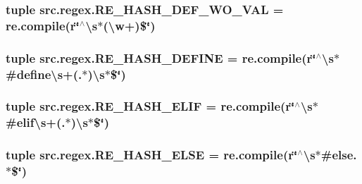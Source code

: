 \hypertarget{namespacesrc_1_1regex_a2c971b22dfac3f240df57813857aeefd}{
\subsubsection[{R\-E\-\_\-\-H\-A\-S\-H\-\_\-\-D\-E\-F\-\_\-\-W\-O\-\_\-\-V\-A\-L}]{\setlength{\rightskip}{0pt plus 5cm}tuple src.\-regex.\-R\-E\-\_\-\-H\-A\-S\-H\-\_\-\-D\-E\-F\-\_\-\-W\-O\-\_\-\-V\-A\-L = re.\-compile(r\char`\"{}$^\wedge$\textbackslash{}s$\ast$(\textbackslash{}w+)\$\char`\"{})}}\label{namespacesrc_1_1regex_a2c971b22dfac3f240df57813857aeefd}
\hypertarget{namespacesrc_1_1regex_a8250e9b27e13553413c3fd8680d99348}{
\subsubsection[{R\-E\-\_\-\-H\-A\-S\-H\-\_\-\-D\-E\-F\-I\-N\-E}]{\setlength{\rightskip}{0pt plus 5cm}tuple src.\-regex.\-R\-E\-\_\-\-H\-A\-S\-H\-\_\-\-D\-E\-F\-I\-N\-E = re.\-compile(r\char`\"{}$^\wedge$\textbackslash{}s$\ast$\#define\textbackslash{}s+(.$\ast$)\textbackslash{}s$\ast$\$\char`\"{})}}\label{namespacesrc_1_1regex_a8250e9b27e13553413c3fd8680d99348}
\hypertarget{namespacesrc_1_1regex_a4041372fdcfc96f1c54040360235f008}{
\subsubsection[{R\-E\-\_\-\-H\-A\-S\-H\-\_\-\-E\-L\-I\-F}]{\setlength{\rightskip}{0pt plus 5cm}tuple src.\-regex.\-R\-E\-\_\-\-H\-A\-S\-H\-\_\-\-E\-L\-I\-F = re.\-compile(r\char`\"{}$^\wedge$\textbackslash{}s$\ast$\#elif\textbackslash{}s+(.$\ast$)\textbackslash{}s$\ast$\$\char`\"{})}}\label{namespacesrc_1_1regex_a4041372fdcfc96f1c54040360235f008}
\hypertarget{namespacesrc_1_1regex_ada84074dfe7c76282dd9c276b132256e}{
\subsubsection[{R\-E\-\_\-\-H\-A\-S\-H\-\_\-\-E\-L\-S\-E}]{\setlength{\rightskip}{0pt plus 5cm}tuple src.\-regex.\-R\-E\-\_\-\-H\-A\-S\-H\-\_\-\-E\-L\-S\-E = re.\-compile(r\char`\"{}$^\wedge$\textbackslash{}s$\ast$\#else.$\ast$\$\char`\"{})}}\label{namespacesrc_1_1regex_ada84074dfe7c76282dd9c276b132256e}
